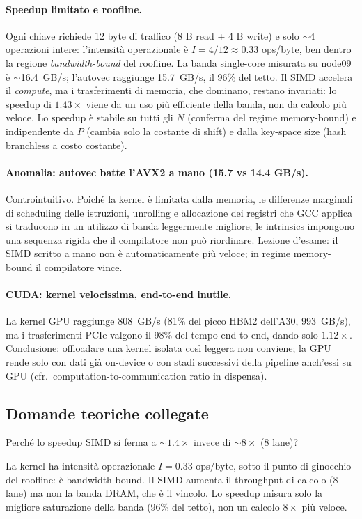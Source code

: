 \documentclass[11pt,a4paper]{article}
\theoremstyle{remark}
\newenvironment{esercizio}[1][]{%
  \begin{tcolorbox}[breakable,title={\textbf{Esercizio / Domanda d'esame}\ifx&#1&\else: #1\fi},
    colback=yellow!5!white, colframe=orange!75!black, fonttitle=\small\bfseries]%
}{%
  \end{tcolorbox}%
}
\newenvironment{risposta}{%
  \begin{tcolorbox}[breakable,title={\textbf{Risposta}},
    colback=green!5!white, colframe=green!50!black, fonttitle=\small\bfseries]%
}{%
  \end{tcolorbox}%
}
\begin{document}
\paragraph{Speedup limitato e roofline.} Ogni chiave richiede 12 byte di traffico (8 B read + 4 B write) e solo $\sim$4 operazioni intere: l'intensit\`a operazionale \`e $I=4/12\approx 0.33$ ops/byte, ben dentro la regione \emph{bandwidth-bound} del roofline. La banda single-core misurata su node09 \`e $\sim$16.4~GB/s; l'autovec raggiunge 15.7~GB/s, il 96\% del tetto. Il SIMD accelera il \emph{compute}, ma i trasferimenti di memoria, che dominano, restano invariati: lo speedup di $1.43\times$ viene da un uso pi\`u efficiente della banda, non da calcolo pi\`u veloce. Lo speedup \`e stabile su tutti gli $N$ (conferma del regime memory-bound) e indipendente da $P$ (cambia solo la costante di shift) e dalla key-space size (hash branchless a costo costante).

\paragraph{Anomalia: autovec batte l'AVX2 a mano (15.7 vs 14.4 GB/s).} Controintuitivo. Poich\'e la kernel \`e limitata dalla memoria, le differenze marginali di scheduling delle istruzioni, unrolling e allocazione dei registri che GCC applica si traducono in un utilizzo di banda leggermente migliore; le intrinsics impongono una sequenza rigida che il compilatore non pu\`o riordinare. Lezione d'esame: il SIMD scritto a mano non \`e automaticamente pi\`u veloce; in regime memory-bound il compilatore vince.

\paragraph{CUDA: kernel velocissima, end-to-end inutile.} La kernel GPU raggiunge 808~GB/s (81\% del picco HBM2 dell'A30, 993~GB/s), ma i trasferimenti PCIe valgono il 98\% del tempo end-to-end, dando solo $1.12\times$. Conclusione: offloadare una kernel isolata cos\`i leggera non conviene; la GPU rende solo con dati gi\`a on-device o con stadi successivi della pipeline anch'essi su GPU (cfr.\ computation-to-communication ratio in dispensa).

\subsection{Domande teoriche collegate}

\begin{esercizio}[M1 -- Roofline]
Perch\'e lo speedup SIMD si ferma a $\sim 1.4\times$ invece di $\sim 8\times$ (8 lane)?
\end{esercizio}
\begin{risposta}
La kernel ha intensit\`a operazionale $I=0.33$ ops/byte, sotto il punto di ginocchio del roofline: \`e bandwidth-bound. Il SIMD aumenta il throughput di calcolo (8 lane) ma non la banda DRAM, che \`e il vincolo. Lo speedup misura solo la migliore saturazione della banda (96\% del tetto), non un calcolo $8\times$ pi\`u veloce.
\end{risposta}
\end{document}
